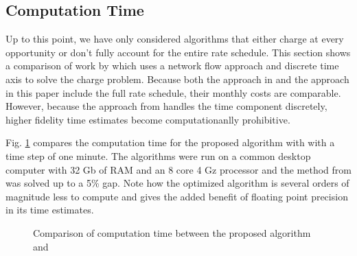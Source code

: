 \subsection{Computation Time\label{sec:results:time}} 
Up to this point, we have only considered algorithms that either charge at every opportunity or don't fully account for the entire rate schedule. This section shows a comparison of work by \cite{mortensen_comprehensive_2021} which uses a network flow approach and discrete time axis to solve the charge problem. Because both the approach in \cite{mortensen_comprehensive_2021} and the approach in this paper include the full rate schedule, their monthly costs are comparable. However, because the approach from \cite{mortensen_comprehensive_2021} handles the time component discretely, higher fidelity time estimates become computationanlly prohibitive. 
\par Fig. \ref{fig:timeComparison} compares the computation time for the proposed algorithm with \cite{mortensen_comprehensive_2021} with a time step of one minute. The algorithms were run on a common desktop computer with 32 Gb of RAM and an 8 core 4 Gz processor and the method from \cite{mortensen_comprehensive_2021} was solved up to a 5\% gap. Note how the optimized algorithm is several orders of magnitude less to compute and gives the added benefit of floating point precision in its time estimates.
\begin{figure}
	\centering
	\caption{Comparison of computation time between the proposed algorithm and \cite{mortensen_comprehensive_2021}}
	\label{fig:timeComparison}
\end{figure}







